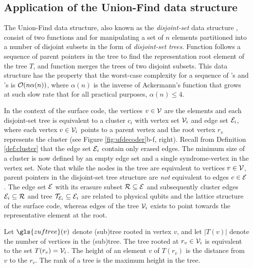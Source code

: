 \subsection{Application of the Union-Find data structure}
The Union-Find data structure, also known as the \emph{disjoint-set} data structure \cite{tarjan1975efficiency}, consist of two functions  and  for manipulating a set of $n$ elements partitioned into a number of disjoint subsets in the form of \emph{disjoint-set trees}. Function  follows a sequence of parent pointers in the tree to find the representation root element of the tree $T$, and function  merges the trees of two disjoint subsets. This data structure has the property that the worst-case complexity for a sequence of 's and 's is $\mathcal{O}(n\alpha(n))$, where $\alpha(n)$ is the inverse of Ackermann's function that grows at such slow rate that for all practical purposes, $\alpha(n)\leq 4$. 

In the context of the surface code, the vertices $v\in \mathcal{V}$ are the elements and each disjoint-set tree is equivalent to a cluster $c_i$ with vertex set $\mathcal{V}_i$ and edge set $\mathcal{E}_i$, where each vertex $v\in \mathcal{V}_i$ points to a parent vertex and the root vertex $r_v$ represents the cluster (see Figure \ref{fig:ufdecoder}b-f, right). Recall from Definition \ref{def:cluster} that the edge set $\mathcal{E}_i$ contain only erased edges.
The minimum size of a cluster is now defined by an empty edge set and a single syndrome-vertex in the vertex set. Note that while the nodes in the tree are equivalent to vertices $v \in \mathcal{V}$, parent pointers in the disjoint-set tree structure are \emph{not} equivalent to edges $e\in \mathcal{E}$. The edge set $\mathcal{E}$ with its erasure subset $\mathcal{R}\subseteq \mathcal{E}$ and subsequently cluster edges $\mathcal{E}_i\subseteq \mathcal{R}$ and tree $\mathcal{T}_{\mathcal{E}_i}\subseteq \mathcal{E}_i$ are related to physical qubits and the lattice structure of the surface code, whereas edges of the tree $\mathcal{V}_i$ exists to point towards the representative element at the root.
\begin{definition}\label{def:trees}
  Let $\gls{zuftree}(v)$ denote (sub)tree rooted in vertex $v$, and let $|T(v)|$ denote the number of vertices in the (sub)tree. The tree rooted at $r_v\in \mathcal{V}_i$ is equivalent to the set $T(r_v)=\mathcal{V}_i$. The height of an element $v$ of $T(r_v)$ is the distance from $v$ to the $r_v$. The rank of a tree is the maximum height in the tree. 
\end{definition}

